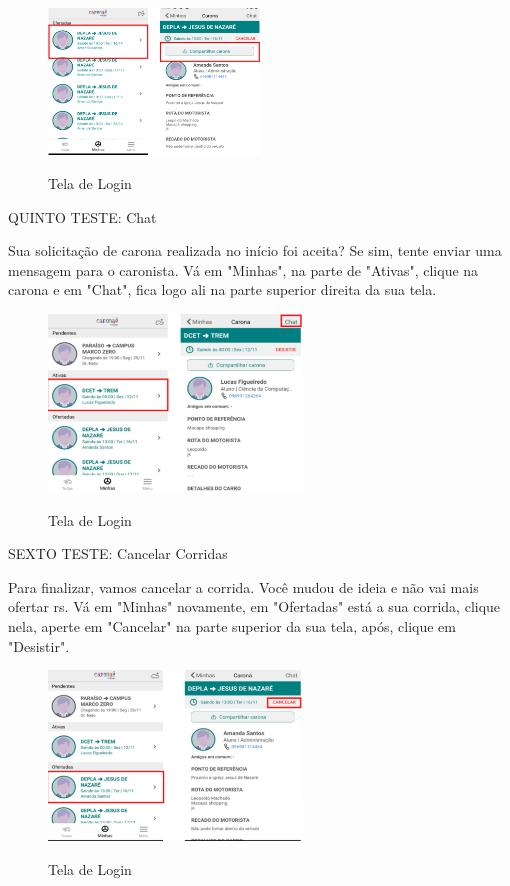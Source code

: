 \begin{figure}[H]
	\centering
	\caption{Tela de Login}
	\includegraphics[width=0.5\textwidth]{./04-figuras/manual/compartilhamento_de_carona.png}
	\label{fig:compartilhamento_de_carona}
\end{figure}

QUINTO TESTE: Chat

Sua solicitação de carona realizada no início foi aceita? Se sim, tente enviar uma mensagem para o caronista.
Vá em "Minhas", na parte de "Ativas", clique na carona e em "Chat", fica logo ali na parte superior direita da sua tela.

\begin{figure}[H]
	\centering
	\caption{Tela de Login}
	\includegraphics[width=0.6\textwidth]{./04-figuras/manual/chat.png}
	\label{fig:chat}
\end{figure}

SEXTO TESTE: Cancelar Corridas

Para finalizar, vamos cancelar a corrida. Você mudou de ideia e não vai mais ofertar rs. Vá em "Minhas" novamente, em "Ofertadas" está a sua corrida, clique nela, aperte em "Cancelar" na parte superior da sua tela, após, clique em "Desistir". 

\begin{figure}[H]
	\centering
	\caption{Tela de Login}
	\includegraphics[width=0.6\textwidth]{./04-figuras/manual/cancelar_carona.png}
	\label{fig:cancelar_carona}
\end{figure}


